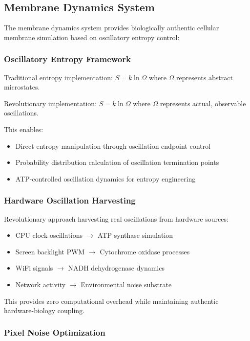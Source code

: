 \documentclass[11pt,a4paper]{article}
\begin{document}
\subsection{Membrane Dynamics System}

The membrane dynamics system provides biologically authentic cellular membrane simulation based on oscillatory entropy control:

\subsubsection{Oscillatory Entropy Framework}

Traditional entropy implementation: $S = k \ln \Omega$ where $\Omega$ represents abstract microstates.

Revolutionary implementation: $S = k \ln \Omega$ where $\Omega$ represents actual, observable oscillations.

This enables:
\begin{itemize}
\item Direct entropy manipulation through oscillation endpoint control
\item Probability distribution calculation of oscillation termination points
\item ATP-controlled oscillation dynamics for entropy engineering
\end{itemize}

\subsubsection{Hardware Oscillation Harvesting}

Revolutionary approach harvesting real oscillations from hardware sources:
\begin{itemize}
\item CPU clock oscillations $\rightarrow$ ATP synthase simulation
\item Screen backlight PWM $\rightarrow$ Cytochrome oxidase processes
\item WiFi signals $\rightarrow$ NADH dehydrogenase dynamics
\item Network activity $\rightarrow$ Environmental noise substrate
\end{itemize}

This provides zero computational overhead while maintaining authentic hardware-biology coupling.

\subsubsection{Pixel Noise Optimization}
\end{document}
